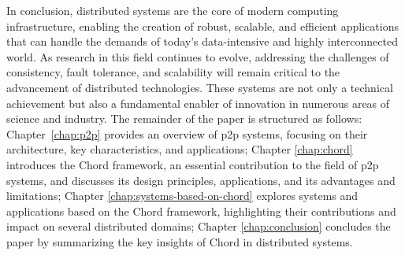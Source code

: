 In conclusion, distributed systems are the core of modern computing infrastructure, enabling the creation of robust, scalable, and efficient applications that can handle the demands of today's data-intensive and highly interconnected world.
As research in this field continues to evolve, addressing the challenges of consistency, fault tolerance, and scalability will remain critical to the advancement of distributed technologies.
These systems are not only a technical achievement but also a fundamental enabler of innovation in numerous areas of science and industry.
The remainder of the paper is structured as follows: Chapter~\ref{chap:p2p} provides an overview of \gls{p2p} systems, focusing on their architecture, key characteristics, and applications;
Chapter \ref{chap:chord} introduces the Chord framework, an essential contribution to the field of \gls{p2p} systems, and discusses its design principles, applications, and its advantages and limitations;
Chapter \ref{chap:systems-based-on-chord} explores systems and applications based on the Chord framework, highlighting their contributions and impact on several distributed domains;
Chapter \ref{chap:conclusion} concludes the paper by summarizing the key insights of Chord in distributed systems.